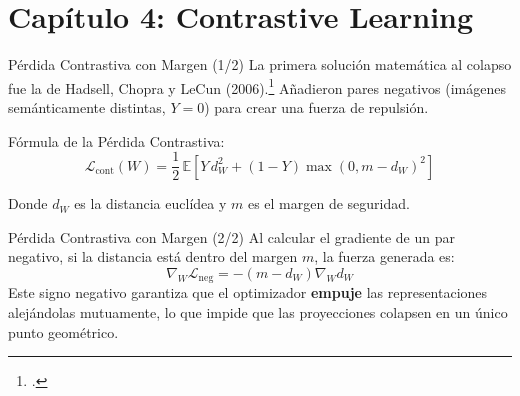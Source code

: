 \documentclass[aspectratio=169, 12pt]{beamer}
\begin{document}
\section{Capítulo 4: Contrastive Learning}

\begin{frame}{Pérdida Contrastiva con Margen (1/2)}
La primera solución matemática al colapso fue la de Hadsell, Chopra y LeCun (2006).\footcite{hadsell2006dimensionality} Añadieron pares negativos (imágenes semánticamente distintas, $Y=0$) para crear una fuerza de repulsión.

\vspace{0.5cm}
Fórmula de la Pérdida Contrastiva:
\[
    \mathcal{L}_\text{cont}(W) = \frac{1}{2}\,\mathbb{E}\left[ Y\, d_W^2 + (1-Y)\max(0, m - d_W)^2 \right]
\]

Donde $d_W$ es la distancia euclídea y $m$ es el margen de seguridad.
\end{frame}

\begin{frame}{Pérdida Contrastiva con Margen (2/2)}
Al calcular el gradiente de un par negativo, si la distancia está dentro del margen $m$, la fuerza generada es:
\[
    \nabla_W \mathcal{L}_{\text{neg}} = -(m - d_W) \nabla_W d_W
\]
Este signo negativo garantiza que el optimizador \textbf{empuje} las representaciones alejándolas mutuamente, lo que impide que las proyecciones colapsen en un único punto geométrico.
\end{frame}
\end{document}
